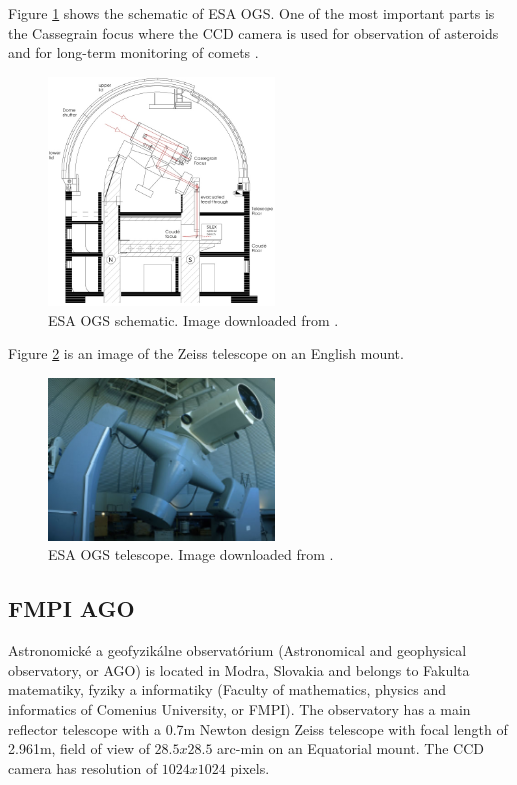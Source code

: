 	Figure \ref{fig:esaogs1} shows the schematic of ESA OGS. One of the most important parts is the Cassegrain focus where the CCD camera is used for observation of asteroids and for long-term monitoring of comets \citep{esaogs}.


\begin{figure}[H]
\centering
  \includegraphics[width=6cm]{images/ESAOGS1}
  \caption{ESA OGS schematic. Image downloaded from \citep{esaogs}.}
  \label{fig:esaogs1}
\end{figure}

	Figure \ref{fig:esaogs2} is an image of the Zeiss telescope on an English mount.

\begin{figure}[H]
\centering
  \includegraphics[width=6cm]{images/ESAOGS2}
  \caption{ESA OGS telescope. Image downloaded from \citep{esaogs}.}
  \label{fig:esaogs2}
\end{figure}

\subsection{FMPI AGO}\label{subsec:fmpi_ago}
Astronomické a geofyzikálne observatórium (Astronomical and geophysical observatory, or AGO) is located in Modra, Slovakia and belongs to Fakulta matematiky, fyziky a informatiky (Faculty of mathematics, physics and informatics of Comenius University, or FMPI). The observatory has a main reflector telescope with a 0.7m Newton design Zeiss telescope with focal length of 2.961m, field of view of $28.5 x 28.5$ arc-min on an Equatorial mount. The CCD camera has resolution of $1024 x 1024$ pixels.

